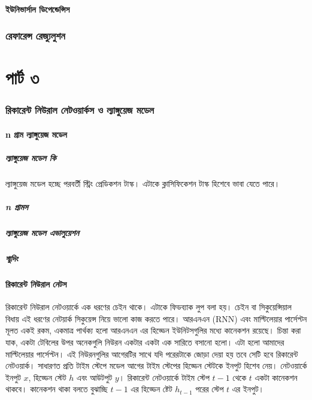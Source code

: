 \documentclass{article}[book]
\begin{document}
\subsection{ইউনিভার্সাল ডিপেন্ডেন্সিস}

\section{রেফারেন্স রেজ্যুলুশন}

 \part{পার্ট ৩} 
\section{রিকারেন্ট নিউরাল নেটওয়ার্কস ও ল্যাঙ্গুয়েজ মডেল}
\subsection{n গ্রাম ল্যাঙ্গুয়েজ মডেল}
\subsubsection{ল্যাঙ্গুয়েজ মডেল কি}
ল্যাঙ্গুয়েজ মডেল হচ্ছে পরবর্তী স্ট্রিং প্রেডিকশন টাস্ক। এটাকে ক্লাসিফিকেশন টাস্ক হিশেবে ভাবা যেতে পারে।
\subsubsection{n গ্রামস}
\subsubsection{ল্যাঙ্গুয়েজ মডেল এভালুয়েশন}
\subsubsection{স্মুদিং}

\subsection{রিকারেন্ট নিউরাল নেটস}
রিকারেন্ট নিউরাল নেটওয়ার্কে \cite{6302929} এক ধরণের চেইন থাকে। এটাকে ফিডব্যাক লুপ বলা হয়। চেইন বা সিকুয়েন্সিয়াল বিধায় এই ধরণের নেটয়ার্ক সিকুয়েন্স নিয়ে ভালো কাজ করতে পারে। 
আরএনএন (RNN) এবং মাল্টিলেয়ার পার্সেপ্টন মূলত একই রকম, একমাত্র পার্থক্য হলো আরএনএন এর হিড্ডেন ইউনিটসগুলির মধ্যে কানেকশন রয়েছে।
চিন্তা করা যাক, একটা টেবিলের উপর অনেকগুলি নিউরন একটার একটা এক সারিতে বসানো হলো। এটা হলো আমাদের মাল্টিলেয়ার পার্সেপ্টন।
এই নিউরনগুলির আগেরটির সাথে যদি পরেরটাকে জোড়া দেয়া হয় তবে সেটি হবে রিকারেন্ট নেটওয়ার্ক। 
সাধারণত প্রতি টাইম স্টেপে মডেল আগের টাইম স্টেপের হিড্ডেন স্টেটকে ইনপুট হিশেব নেয়। নেটওয়ার্কে ইনপুট $x$, হিড্ডেন স্টেট $h$ এবং আউটপুট $y$। 
রিকারেন্ট নেটওয়ার্কে টাইম স্টেপ  $t-1$ থেকে $t$ একটা কানেকশন থাকবে। কানেকশন থাকা বলতে বুঝাচ্ছি $t-1$ এর হিড্ডেন ষ্টেট $h_{t-1}$ পরের স্টেপ $t$ এর ইনপুট। 
\end{document}
